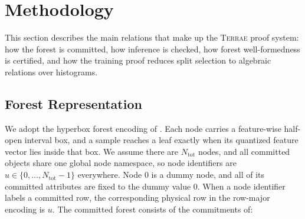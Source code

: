 \section{Methodology}\label{sec:methodology}

This section describes the main relations that make up the \textsc{Terrae}
proof system: how the forest is committed, how inference is checked, how forest
well-formedness is certified, and how the training proof reduces split
selection to algebraic relations over histograms.

\subsection{Forest Representation}

We adopt the hyperbox forest encoding of \cite{cq++24}. Each node carries a
feature-wise half-open interval box, and a sample reaches a leaf exactly when
its quantized feature vector lies inside that box. 
We assume there are $N_{\mathrm{tot}}$ nodes, and
all committed objects share
one global node namespace, so node identifiers are
$u \in \{0,\ldots,N_{\mathrm{tot}}-1\}$ everywhere. Node $0$ is a dummy node, and
all of its committed attributes are fixed to the dummy value $0$. When a node identifier labels
a committed row, the corresponding physical row in the row-major encoding is
$u$. The committed
forest consists of the commitments of:
